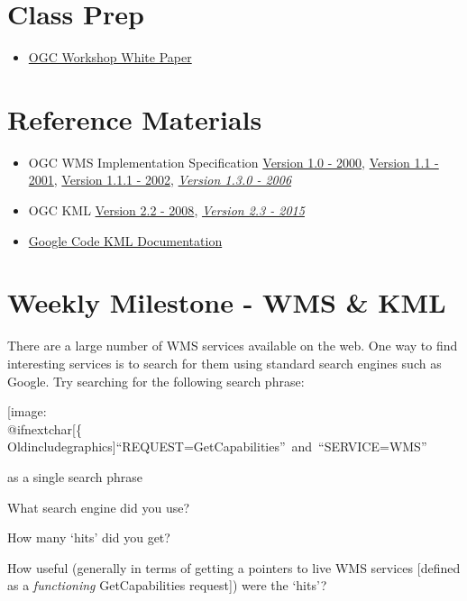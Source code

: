 \documentclass[]{book}
\makeatletter
\providecommand{\tightlist}{%
  \setlength{\itemsep}{0pt}\setlength{\parskip}{0pt}}
\def\ScaleIfNeeded{%
  \ifdim\Gin@nat@width>.5\linewidth
    .5\linewidth
  \else
    \Gin@nat@width
  \fi
}
\let\Oldincludegraphics\texttt{[image: \%
 \\catcode`\\@=11\\relax\%
 \%\\gdef\\includegraphics\{\\@ifnextchar[\{\\Oldincludegraphics]}{\Oldincludegraphics[width=\ScaleIfNeeded]}}%
\gdef\texttt{[image: \\@ifnextchar[\{\\Oldincludegraphics]}{\Oldincludegraphics[max size={.75\textwidth}{.75\textheight}]}}%
\makeatother
\begin{document}
\section{Class Prep}\label{week06-prep}

\begin{itemize}
\tightlist
\item
  \href{http://karlbenedict.com/documents/ogcworkshop.pdf}{OGC Workshop
  White Paper}
\end{itemize}

\section{Reference Materials}\label{week06-reference}

\begin{itemize}
\item
  OGC WMS Implementation Specification
  \href{http://portal.opengeospatial.org/files/?artifact_id=7196}{Version
  1.0 - 2000},
  \href{http://portal.opengeospatial.org/files/?artifact_id=1058}{Version
  1.1 - 2001},
  \href{http://portal.opengeospatial.org/files/?artifact_id=1081\&version=1\&format=pdf}{Version
  1.1.1 - 2002},
  \href{http://portal.opengeospatial.org/files/?artifact_id=14416}{\emph{Version
  1.3.0 - 2006}}
\item
  OGC KML
  \href{http://portal.opengeospatial.org/files/?artifact_id=27810}{Version
  2.2 - 2008},
  \href{http://docs.opengeospatial.org/is/12-007r2/12-007r2.html}{\emph{Version
  2.3 - 2015}}
\item
  \href{https://developers.google.com/kml/documentation/}{Google Code
  KML Documentation}
\end{itemize}

\section{Weekly Milestone - WMS \& KML}\label{week06-milestone}

There are a large number of WMS services available on the web. One way
to find interesting services is to search for them using standard search
engines such as Google. Try searching for the following search phrase:

\texttt{“REQUEST=GetCapabilities”\ and\ “SERVICE=WMS”}

as a single search phrase

\begin{description}
\tightlist
\item[Question 1]
What search engine did you use?
\item[Question 2]
How many `hits' did you get?
\item[Question 3]
How useful (generally in terms of getting a pointers to live WMS
services {[}defined as a \emph{functioning} GetCapabilities request{]})
were the `hits'?
\end{description}
\end{document}
